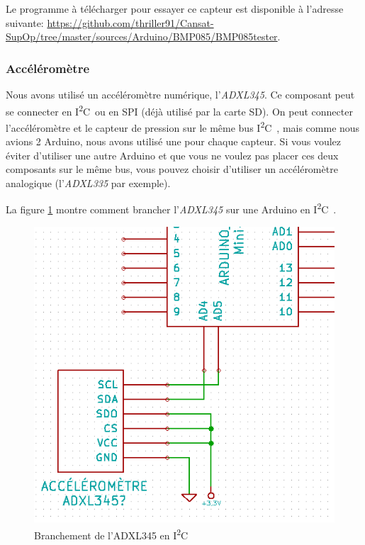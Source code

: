 \documentclass[twocolumn, 8pt]{article}
\newcommand\IdC{I\textsuperscript{2}C~}
\begin{document}
\par Le programme à télécharger pour essayer ce capteur est disponible à l'adresse suivante: \url{https://github.com/thriller91/Cansat-SupOp/tree/master/sources/Arduino/BMP085/BMP085tester}.

\subsubsection{Accéléromètre}
\par Nous avons utilisé un accéléromètre numérique, l'\emph{ADXL345}. Ce composant peut se connecter en \IdC ou en SPI (déjà utilisé par la carte SD). On peut connecter l'accéléromètre et le capteur de pression sur le même bus \IdC, mais comme nous avions 2 Arduino, nous avons utilisé une pour chaque capteur. Si vous voulez éviter d'utiliser une autre Arduino et que vous ne voulez pas placer ces deux composants sur le même bus, vous pouvez choisir d'utiliser un accéléromètre analogique (l'\emph{ADXL335} par exemple).

\par La figure \ref{ADXL345} montre comment brancher l'\emph{ADXL345} sur une Arduino en \IdC.

\begin{figure}[!h]
	\centering
	\includegraphics[scale=.25]{ADXL345.png}
	\caption{Branchement de l'ADXL345 en \IdC}
	\label{ADXL345}
\end{figure}
\end{document}
